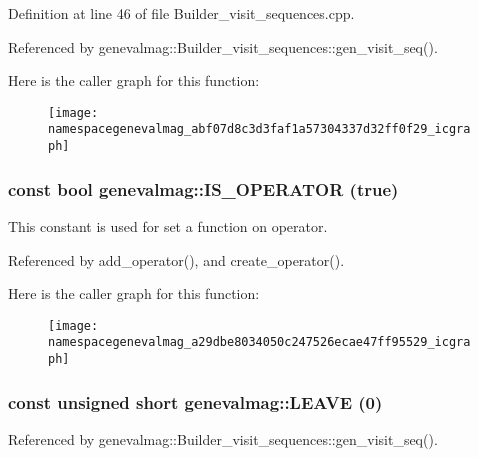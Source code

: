 Definition at line 46 of file Builder\_\-visit\_\-sequences.cpp.



Referenced by genevalmag::Builder\_\-visit\_\-sequences::gen\_\-visit\_\-seq().



Here is the caller graph for this function:\nopagebreak
\begin{figure}[H]
\begin{center}
\leavevmode
\texttt{[image: namespacegenevalmag\_abf07d8c3d3faf1a57304337d32ff0f29\_icgraph]}
\end{center}
\end{figure}


\hypertarget{namespacegenevalmag_a29dbe8034050c247526ecae47ff95529}{
\subsubsection[{IS\_\-OPERATOR}]{\setlength{\rightskip}{0pt plus 5cm}const bool genevalmag::IS\_\-OPERATOR (true)}}
\label{namespacegenevalmag_a29dbe8034050c247526ecae47ff95529}
This constant is used for set a function on operator. 

Referenced by add\_\-operator(), and create\_\-operator().



Here is the caller graph for this function:\nopagebreak
\begin{figure}[H]
\begin{center}
\leavevmode
\texttt{[image: namespacegenevalmag\_a29dbe8034050c247526ecae47ff95529\_icgraph]}
\end{center}
\end{figure}


\hypertarget{namespacegenevalmag_a48db0c2de005498a27cd549338a38cdd}{
\subsubsection[{LEAVE}]{\setlength{\rightskip}{0pt plus 5cm}const unsigned short genevalmag::LEAVE (0)}}
\label{namespacegenevalmag_a48db0c2de005498a27cd549338a38cdd}


Referenced by genevalmag::Builder\_\-visit\_\-sequences::gen\_\-visit\_\-seq().



